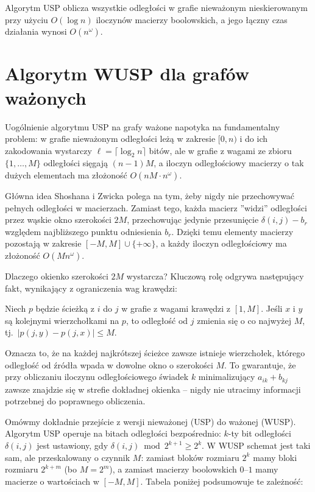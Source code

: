 \begin{twierdzenie}
Algorytm USP oblicza wszystkie odległości w grafie nieważonym nieskierowanym przy użyciu $O(\log n)$ iloczynów macierzy boolowskich, a jego łączny czas działania wynosi $O(n^\omega)$.
\end{twierdzenie}

\section{Algorytm WUSP dla grafów ważonych}

Uogólnienie algorytmu USP na grafy ważone napotyka na fundamentalny problem: w grafie nieważonym odległości leżą w zakresie $[0, n)$ i do ich zakodowania wystarczy $\ell = \lceil \log_2 n \rceil$ bitów, ale w grafie z wagami ze zbioru $\{1, \ldots, M\}$ odległości sięgają $(n-1)M$, a iloczyn odległościowy macierzy o tak dużych elementach ma złożoność $O(nM \cdot n^\omega)$.

Główna idea Shoshana i Zwicka polega na tym, żeby nigdy nie przechowywać pełnych odległości w macierzach. Zamiast tego, każda macierz ''widzi'' odległości przez wąskie okno szerokości $2M$, przechowując jedynie przesunięcie $\delta(i,j) - b_r$ względem najbliższego punktu odniesienia $b_r$. Dzięki temu elementy macierzy pozostają w zakresie $[-M, M] \cup \{+\infty\}$, a każdy iloczyn odległościowy ma złożoność $O(M n^\omega)$.

Dlaczego okienko szerokości $2M$ wystarcza? Kluczową rolę odgrywa następujący fakt, wynikający z ograniczenia wag krawędzi:

\begin{lemat}
Niech $p$ będzie ścieżką z $i$ do $j$ w grafie z wagami krawędzi z $[1, M]$. Jeśli $x$ i $y$ są kolejnymi wierzchołkami na $p$, to odległość od $j$ zmienia się o co najwyżej $M$, tj.\ $|p(j,y) - p(j,x)| \leq M$.
\end{lemat}

Oznacza to, że na każdej najkrótszej ścieżce zawsze istnieje wierzchołek, którego odległość od źródła wpada w dowolne okno o szerokości $M$. To gwarantuje, że przy obliczaniu iloczynu odległościowego świadek $k$ minimalizujący $a_{ik} + b_{kj}$ zawsze znajdzie się w strefie dokładnej okienka -- nigdy nie utracimy informacji potrzebnej do poprawnego obliczenia.

Omówmy dokładnie przejście z wersji nieważonej (USP) do ważonej (WUSP). Algorytm USP operuje na bitach odległości bezpośrednio: $k$-ty bit odległości $\delta(i,j)$ jest ustawiony, gdy $\delta(i,j) \bmod 2^{k+1} \geq 2^k$. W WUSP schemat jest taki sam, ale przeskalowany o czynnik $M$: zamiast bloków rozmiaru $2^k$ mamy bloki rozmiaru $2^{k+m}$ (bo $M = 2^m$), a zamiast macierzy boolowskich $0$--$1$ mamy macierze o wartościach w $[-M, M]$. Tabela poniżej podsumowuje te zależność:

